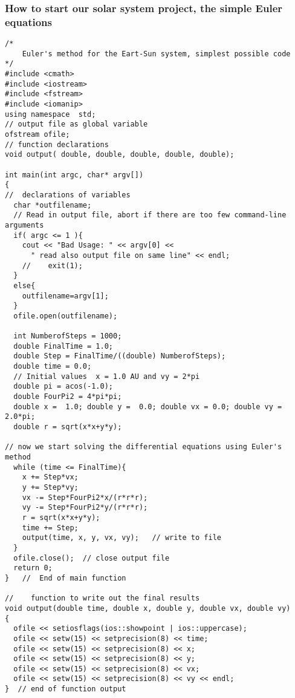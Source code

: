 \documentclass{beamer}
\begin{document}
\begin{frame}
\frametitle{How to start our solar system project, the simple Euler equations}

\begin{verbatim}
/*    
    Euler's method for the Eart-Sun system, simplest possible code
*/ 
#include <cmath>
#include <iostream>
#include <fstream>
#include <iomanip>
using namespace  std;
// output file as global variable
ofstream ofile;
// function declarations
void output( double, double, double, double, double);

int main(int argc, char* argv[])
{
//  declarations of variables
  char *outfilename;
  // Read in output file, abort if there are too few command-line arguments
  if( argc <= 1 ){
    cout << "Bad Usage: " << argv[0] <<
      " read also output file on same line" << endl;
    //    exit(1);
  }
  else{
    outfilename=argv[1];
  }
  ofile.open(outfilename);

  int NumberofSteps = 1000;
  double FinalTime = 1.0;
  double Step = FinalTime/((double) NumberofSteps);
  double time = 0.0;
  // Initial values  x = 1.0 AU and vy = 2*pi
  double pi = acos(-1.0);
  double FourPi2 = 4*pi*pi;
  double x =  1.0; double y =  0.0; double vx = 0.0; double vy = 2.0*pi;
  double r = sqrt(x*x+y*y);

// now we start solving the differential equations using Euler's method
  while (time <= FinalTime){
    x += Step*vx;
    y += Step*vy;
    vx -= Step*FourPi2*x/(r*r*r);
    vy -= Step*FourPi2*y/(r*r*r);
    r = sqrt(x*x+y*y);
    time += Step;
    output(time, x, y, vx, vy);   // write to file 
  }
  ofile.close();  // close output file
  return 0;
}   //  End of main function 

//    function to write out the final results
void output(double time, double x, double y, double vx, double vy)
{
  ofile << setiosflags(ios::showpoint | ios::uppercase);
  ofile << setw(15) << setprecision(8) << time;
  ofile << setw(15) << setprecision(8) << x;
  ofile << setw(15) << setprecision(8) << y;
  ofile << setw(15) << setprecision(8) << vx;
  ofile << setw(15) << setprecision(8) << vy << endl;
}  // end of function output


\end{verbatim}
\end{frame}
\end{document}
